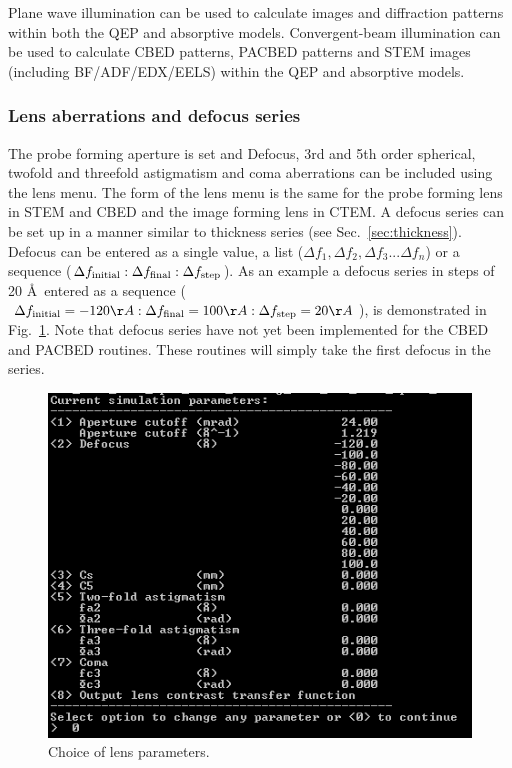 \documentclass[12pt,a4paper]{article}
\begin{document}
Plane wave illumination can be used to calculate images and diffraction patterns within both the QEP and absorptive models.
Convergent-beam illumination can be used to calculate CBED patterns, PACBED patterns and STEM images (including BF/ADF/EDX/EELS) within the QEP and absorptive models.

\subsubsection{Lens aberrations and defocus series}
%
The probe forming aperture is set and Defocus, 3rd and 5th order spherical, twofold and threefold astigmatism and coma aberrations can be included using the lens menu. The form of the lens menu is the same for the probe forming lens in STEM and CBED and the image forming lens in CTEM. A defocus series can be set up in a manner similar to thickness series (see Sec.~\ref{sec:thickness}). Defocus can be entered as a single value, a list
($ \Delta f_1,\Delta f_2,\Delta f_3...\Delta f_n $)
or a sequence
($ \Delta f_{\rm initial}:\Delta f_{\rm final}:\Delta f_{\rm step}  $).
As an example a defocus series in steps of 20 \AA\, entered as a sequence ($ \Delta f_{\rm initial}=-120\AA:\Delta f_{\rm final}=100\AA:\Delta f_{\rm step}=20\AA  $), is demonstrated in Fig.~\ref{fig:lens_parameters}. Note that defocus series have not yet been implemented for the CBED and PACBED routines. These routines will simply take the first defocus in the series.
%
\begin{figure}[!h]
	\begin{center}
		\includegraphics[scale=1.0]{lens_parameters.png}
		\caption{Choice of lens parameters.}
		\label{fig:lens_parameters}
	\end{center}
\end{figure}
\end{document}
